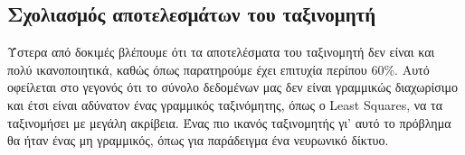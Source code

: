 \subsection{Σχολιασμός αποτελεσμάτων του ταξινομητή}
Ύστερα από δοκιμές βλέπουμε ότι τα αποτελέσματα του ταξινομητή δεν είναι και πολύ ικανοποιητικά, καθώς όπως παρατηρούμε έχει επιτυχία περίπου 60\%.
Αυτό οφείλεται στο γεγονός ότι το σύνολο δεδομένων μας δεν είναι γραμμικώς διαχωρίσιμο και έτσι είναι αδύνατον ένας γραμμικός ταξινόμητης, όπως ο Least Squares, να τα ταξινομήσει με μεγάλη ακρίβεια.
Ένας πιο ικανός ταξινομητής γι’ αυτό το πρόβλημα θα ήταν ένας μη γραμμικός, όπως για παράδειγμα ένα νευρωνικό δίκτυο.
